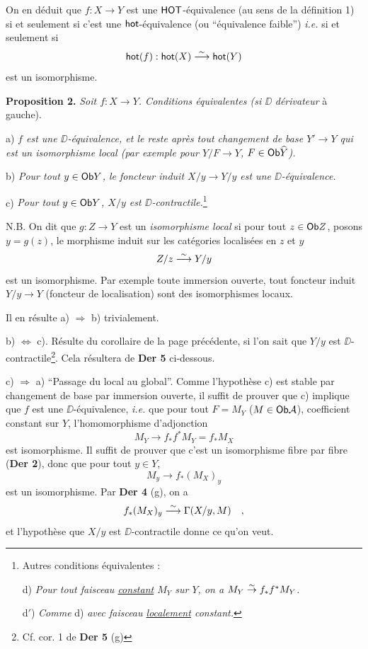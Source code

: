 \noindent On en déduit que $f : X \to Y$ est une $\mathsf{HOT}$-équivalence (au sens de la définition 1) si et seulement si c'est une $\mathsf{hot}$-équivalence (ou “équivalence faible”) \textit{i.e.} si et seulement si
\[
\mathsf{hot}(f) : \mathsf{hot}(X) \overset{\sim}{\longrightarrow} \mathsf{hot}(Y)
\]
est un isomorphisme.

\noindent\textbf{Proposition 2.} \textit{Soit $f : X \to Y$. Conditions équivalentes (si $\DD$} \textit{dérivateur} à gauche). %

a) \textit{$f$ est une $\DD$-équivalence, et le reste après tout changement de base $Y' \to Y$ qui est un isomorphisme local (par exemple pour $Y/F \to Y$, $F \in \mathsf{Ob} \widehat{Y}$).}

b) \textit{Pour tout $y \in \mathsf{Ob} Y$, le foncteur induit $X/y \to Y/y$ est une $\DD$-équivalence.}

c) \textit{Pour tout $y \in \mathsf{Ob} Y$, $X/y$ est $\DD$-contractile.}\footnote[25]{Autres conditions équivalentes :\par
\indent d) \textit{Pour tout faisceau \underline{constant} $M_Y$ sur $Y$, on a $M_Y \overset{\sim}{\to} f_*f^*M_Y$.}\par
\indent d$'$) \textit{Comme} d) \textit{avec faisceau \underline{localement} constant.}}

\noindent N.B. On dit que $g : Z \to Y$ est un \textit{isomorphisme local} si pour tout $z \in \mathsf{Ob} Z$, posons $y = g(z)$, le morphisme induit sur les catégories localisées en $z$ et $y$
\[
Z/z \overset{\sim}{\longrightarrow} Y/y
\]
est un isomorphisme. Par exemple toute immersion ouverte, tout foncteur induit $Y/y \to Y$ (foncteur de localisation) sont des isomorphismes locaux.

Il en résulte a) $\Rightarrow$ b) trivialement.

b) $\Leftrightarrow$ c). Résulte du corollaire de la page précédente, si l'on sait que $Y/y$ est $\DD$-contractile\footnote[26]{Cf. cor. 1 de \textbf{Der 5} (g)}. Cela résultera de \textbf{Der 5} ci-dessous.

\noindent{}

c) $\Rightarrow$ a) “Passage du local au global”. Comme l'hypothèse c) est stable par changement de base par immersion ouverte, il suffit de prouver que c) implique que $f$ est une $\DD$-équivalence, \textit{i.e.} que pour tout $F = M_Y$ ($M \in \mathsf{Ob} \mathcal{A}$), coefficient constant sur $Y$, l'homomorphisme d'adjonction
\[
M_Y \longrightarrow f_*f^*M_Y = f_*M_X
\]
est isomorphisme. Il suffit de prouver que c'est un isomorphisme fibre par fibre (\textbf{Der 2}), donc que pour tout $y \in Y$,
\[
M_y \longrightarrow f_*(M_X)_y
\]
est un isomorphisme. Par \textbf{Der 4} (g), on a
\[
f_*(M_X)_y \overset{\sim}{\longrightarrow} \Gamma(X/y, M) \quad ,
\]
et l'hypothèse que $X/y$ est $\DD$-contractile donne ce qu'on veut.

